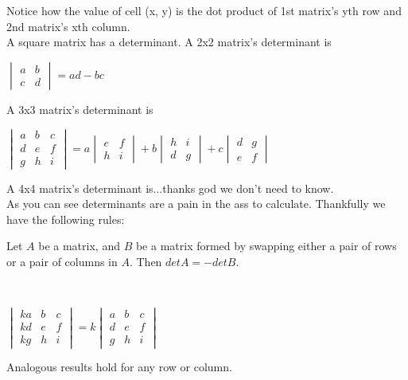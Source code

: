 \documentclass[11pt]{scrartcl}
\begin{document}
Notice how the value of cell (x, y) is the dot product of 1st matrix's yth row and 2nd matrix's xth column.\\
A square matrix has a determinant. A 2x2 matrix's determinant is
\begin{center}
  $\begin{vmatrix} a & b \\ c & d \end{vmatrix} = ad - bc$
\end{center}
A 3x3 matrix's determinant is
\begin{center}
  $\begin{vmatrix} a & b & c \\ d & e & f \\ g & h & i \end{vmatrix} = a\begin{vmatrix} e & f \\ h & i \end{vmatrix} + b\begin{vmatrix} h & i \\ d & g \end{vmatrix} + c\begin{vmatrix} d & g \\ e & f \end{vmatrix}$
\end{center}
A 4x4 matrix's determinant is...thanks god we don't need to know.\\
As you can see determinants are a pain in the ass to calculate. Thankfully we have the following rules:
\begin{proposition}
  Let $A$ be a matrix, and $B$ be a matrix formed by swapping either a pair of rows or a pair of columns in $A$. Then $det A = - det B$.
\end{proposition}
\begin{proposition} \label{timek}\
  \begin{center}
    $\begin{vmatrix} ka & b & c \\ kd & e & f \\ kg & h & i \end{vmatrix} =
    k\begin{vmatrix} a & b & c \\ d & e & f \\ g & h & i \end{vmatrix} $
  \end{center}
    Analogous results hold for any row or column. 
\end{proposition}
\end{document}
